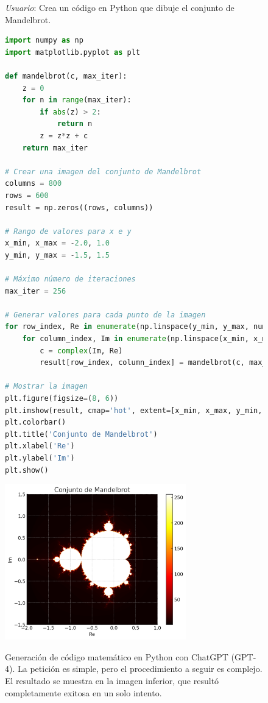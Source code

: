 \begin{figure}%
    \caption[Generación de código matemático en Python con ChatGPT (GPT-4)]{Generación de código matemático en Python con ChatGPT (GPT-4). La petición es simple, pero el procedimiento a seguir es complejo. El resultado se muestra en la imagen inferior, que resultó completamente exitosa en un solo intento.}
      \centering
      \begin{mdframed}
        \fontsize{9.5pt}{11pt}\selectfont
        \emph{Usuario}: Crea un código en Python que dibuje el conjunto de Mandelbrot.
      \end{mdframed}
        \centering
        \begin{mdframed}
          \fontsize{9.5pt}{11pt}\selectfont
        \begin{lstlisting}[language=Python, basicstyle=\footnotesize\ttfamily, keywordstyle=\color{blue}, commentstyle=\color{green}, stringstyle=\color{red},
        numbers=none]
import numpy as np
import matplotlib.pyplot as plt

def mandelbrot(c, max_iter):
    z = 0
    for n in range(max_iter):
        if abs(z) > 2:
            return n
        z = z*z + c
    return max_iter

# Crear una imagen del conjunto de Mandelbrot
columns = 800
rows = 600
result = np.zeros((rows, columns))

# Rango de valores para x e y
x_min, x_max = -2.0, 1.0
y_min, y_max = -1.5, 1.5

# Máximo número de iteraciones
max_iter = 256

# Generar valores para cada punto de la imagen
for row_index, Re in enumerate(np.linspace(y_min, y_max, num=rows)):
    for column_index, Im in enumerate(np.linspace(x_min, x_max, num=columns)):
        c = complex(Im, Re)
        result[row_index, column_index] = mandelbrot(c, max_iter)

# Mostrar la imagen
plt.figure(figsize=(8, 6))
plt.imshow(result, cmap='hot', extent=[x_min, x_max, y_min, y_max])
plt.colorbar()
plt.title('Conjunto de Mandelbrot')
plt.xlabel('Re')
plt.ylabel('Im')
plt.show()              
        \end{lstlisting}
      \end{mdframed}
        \includegraphics[width=0.7\textwidth]{./figuras/python_mandelbrot.png}
    \source{\propio}
    \label{fig:python_mandelbrot}
\end{figure}


